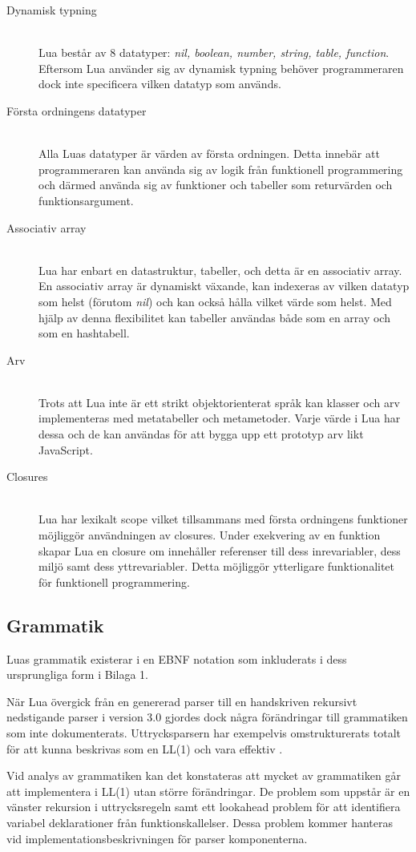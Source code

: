 \begin{description}
  \item[Dynamisk typning] \hfill \\
    Lua består av 8 datatyper: \textit{nil, boolean, number, string, table,
      function}. Eftersom Lua använder sig av dynamisk typning behöver
    programmeraren dock inte specificera vilken datatyp som används.

  \item[Första ordningens datatyper] \hfill \\
    Alla Luas datatyper är värden av första ordningen. Detta innebär att
    programmeraren kan använda sig av logik från funktionell programmering och
    därmed använda sig av funktioner och tabeller som returvärden och
    funktionsargument.

  \item[Associativ array] \hfill \\
    Lua har enbart en datastruktur, tabeller, och detta är en associativ
    array. En associativ array är dynamiskt växande, kan indexeras av vilken
    datatyp som helst (förutom \textit{nil}) och kan också hålla vilket värde
    som helst. Med hjälp av denna flexibilitet kan tabeller användas både som
    en array och som en hashtabell.

  \item[Arv] \hfill \\
    Trots att Lua inte är ett strikt objektorienterat språk kan klasser och
    arv implementeras med metatabeller och metametoder. Varje värde i Lua har
    dessa och de kan användas för att bygga upp ett prototyp arv likt
    JavaScript.

  \item[Closures] \hfill \\
    Lua har lexikalt scope vilket tillsammans med första ordningens funktioner
    möjliggör användningen av closures. Under exekvering av en funktion skapar
    Lua en closure om innehåller referenser till dess inrevariabler, dess
    miljö samt dess yttrevariabler. Detta möjliggör ytterligare funktionalitet
    för funktionell programmering.
\end{description}

\subsection{Grammatik}

Luas grammatik existerar i en EBNF notation som inkluderats i dess
ursprungliga form i Bilaga 1.

När Lua övergick från en genererad parser till en handskriven rekursivt
nedstigande parser i version 3.0 \citep{luaimp} gjordes dock några
förändringar till grammatiken som inte dokumenterats. Uttrycksparsern har
exempelvis omstrukturerats totalt för att kunna beskrivas som en LL(1) och
vara effektiv \citep[s. 175]{bf09}.

Vid analys av grammatiken kan det konstateras att mycket av grammatiken går att
implementera i LL(1) utan större förändringar. De problem som uppstår är en
vänster rekursion i uttrycksregeln samt ett lookahead problem för att
identifiera variabel deklarationer från funktionskallelser. Dessa problem
kommer hanteras vid implementationsbeskrivningen för parser komponenterna.
